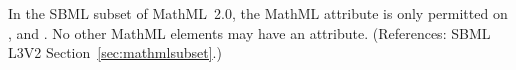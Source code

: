 In the SBML subset of MathML~2.0, the MathML attribute
 is only permitted on ,
 and .  No other
MathML elements may have an  attribute.
(References: SBML L3V2 Section~\ref{sec:mathmlsubset}.)
